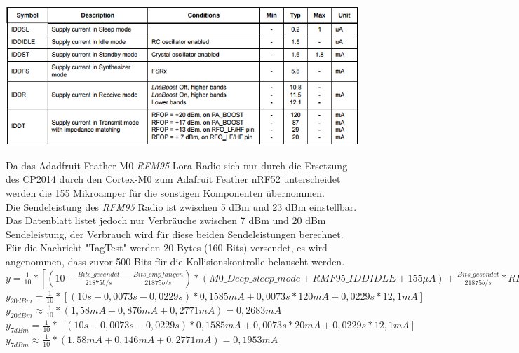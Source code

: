 \begin{table}[h]
  \centering
  \caption{Stromverbrauch des \emph{RFM95}, aus \cite{hope2006rfm}}
	\includegraphics[width=\textwidth]{images/lorapower.png}
  \label{table:lorapower}
\end{table}

Da das Adadfruit Feather M0 \emph{RFM95} Lora Radio sich nur durch die Ersetzung des CP2014 durch den Cortex-M0 zum Adafruit Feather nRF52 unterscheidet werden die 155 Mikroamper für die sonstigen Komponenten übernommen.\\
Die Sendeleistung des \emph{RFM95} Radio ist zwischen 5 dBm und 23 dBm einstellbar. 
Das Datenblatt listet jedoch nur Verbräuche zwischen 7 dBm und 20 dBm Sendeleistung, der Verbrauch wird für diese beiden Sendeleistungen berechnet.
Für die Nachricht "{}TagTest"{} werden 20 Bytes (160 Bits) versendet, es wird angenommen, dass zuvor 500 Bits für die Kollisionskontrolle belauscht werden.\\[1cm]

$y = \frac{1}{10} * [(10 - \frac{Bits\_gesendet}{21875 b/s} - \frac{Bits\_empfangen}{21875 b/s}) * (M0\_Deep\_sleep\_mode + RMF95\_IDDIDLE + 155 {\mu}A) + \frac{Bits\_gesendet}{21875 b/s} * RFM95\_XdBm + \frac{Bits\_empfangen}{21875 b/s} * RFM95\_IDDR]$\\[0.5cm]
$y_{20dBm} = \frac{1}{10} * [(10s - 0,0073s - 0,0229s) * 0,1585mA + 0,0073s * 120mA + 0,0229s * 12,1mA]$\\[0.5cm]
$y_{20dBm} \approx \frac{1}{10} * (1,58mA + 0,876mA + 0,2771mA) = 0,2683mA$\\[1cm]

$y_{7dBm} = \frac{1}{10} * [(10s - 0,0073s - 0,0229s) * 0,1585mA + 0,0073s * 20mA + 0,0229s * 12,1mA]$\\[0.5cm]
$y_{7dBm} \approx \frac{1}{10} * (1,58mA + 0,146mA + 0,2771mA) = 0,1953mA$\\[1cm]

